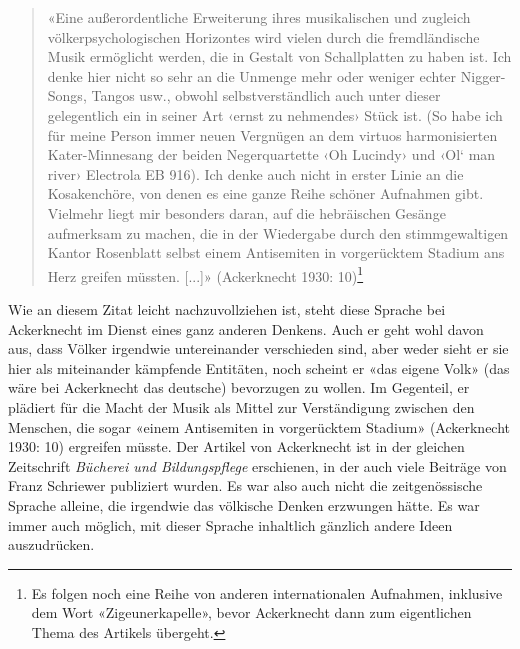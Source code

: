 \documentclass[a4paper,
fontsize=11pt,
oneside,
numbers=noperiodatend,
parskip=half-,
bibliography=totoc,
final
]{scrartcl}
\begin{document}
\begin{quote}
«Eine außerordentliche Erweiterung ihres musikalischen und zugleich
völkerpsychologischen Horizontes wird vielen durch die fremdländische
Musik ermöglicht werden, die in Gestalt von Schallplatten zu haben ist.
Ich denke hier nicht so sehr an die Unmenge mehr oder weniger echter
Nigger-Songs, Tangos usw., obwohl selbstverständlich auch unter dieser
gelegentlich ein in seiner Art ‹ernst zu nehmendes› Stück ist. (So habe
ich für meine Person immer neuen Vergnügen an dem virtuos harmonisierten
Kater-Minnesang der beiden Negerquartette ‹Oh Lucindy› und ‹Ol` man
river› Electrola EB 916). Ich denke auch nicht in erster Linie an die
Kosakenchöre, von denen es eine ganze Reihe schöner Aufnahmen gibt.
Vielmehr liegt mir besonders daran, auf die hebräischen Gesänge
aufmerksam zu machen, die in der Wiedergabe durch den stimmgewaltigen
Kantor Rosenblatt selbst einem Antisemiten in vorgerücktem Stadium ans
Herz greifen müssten. {[}...{]}» (Ackerknecht 1930: 10)\footnote{Es
  folgen noch eine Reihe von anderen internationalen Aufnahmen,
  inklusive dem Wort «Zigeunerkapelle», bevor Ackerknecht dann zum
  eigentlichen Thema des Artikels übergeht.}
\end{quote}

Wie an diesem Zitat leicht nachzuvollziehen ist, steht diese Sprache bei
Ackerknecht im Dienst eines ganz anderen Denkens. Auch er geht wohl
davon aus, dass Völker irgendwie untereinander verschieden sind, aber
weder sieht er sie hier als miteinander kämpfende Entitäten, noch
scheint er «das eigene Volk» (das wäre bei Ackerknecht das deutsche)
bevorzugen zu wollen. Im Gegenteil, er plädiert für die Macht der Musik
als Mittel zur Verständigung zwischen den Menschen, die sogar «einem
Antisemiten in vorgerücktem Stadium» (Ackerknecht 1930: 10) ergreifen
müsste. Der Artikel von Ackerknecht ist in der gleichen Zeitschrift
\emph{Bücherei und Bildungspflege} erschienen, in der auch viele
Beiträge von Franz Schriewer publiziert wurden. Es war also auch nicht
die zeitgenössische Sprache alleine, die irgendwie das völkische Denken
erzwungen hätte. Es war immer auch möglich, mit dieser Sprache
inhaltlich gänzlich andere Ideen auszudrücken.
\end{document}
